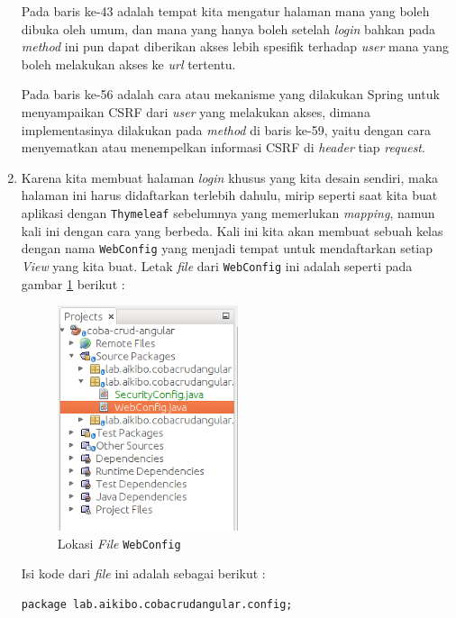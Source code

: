 \begin{enumerate}
	Pada baris ke-43 adalah tempat kita mengatur halaman mana yang boleh dibuka oleh umum, dan mana yang hanya boleh setelah \textit{login} bahkan pada \textit{method} ini pun dapat diberikan akses lebih spesifik terhadap \textit{user} mana yang boleh melakukan akses ke \textit{url} tertentu.
	
	Pada baris ke-56 adalah cara atau mekanisme yang dilakukan Spring untuk menyampaikan CSRF dari \textit{user} yang melakukan akses, dimana implementasinya dilakukan pada \textit{method} di baris ke-59, yaitu dengan cara menyematkan atau menempelkan informasi CSRF di \textit{header} tiap \textit{request}.
	
	\item Karena kita membuat halaman \textit{login} khusus yang kita desain sendiri, maka halaman ini harus didaftarkan terlebih dahulu, mirip seperti saat kita buat aplikasi dengan \texttt{Thymeleaf} sebelumnya yang memerlukan \textit{mapping}, namun kali ini dengan cara yang berbeda. Kali ini kita akan membuat sebuah kelas dengan nama \texttt{WebConfig} yang menjadi tempat untuk mendaftarkan setiap \textit{View} yang kita buat. Letak \textit{file} dari \texttt{WebConfig} ini adalah seperti pada gambar \ref{fig:letak-WebConfig} berikut :
	
	\begin{figure}[H]
		\centering
		\includegraphics[width=0.5\textwidth]{./resources/023-lokasi-webconfig}
		\caption{Lokasi \textit{File} \texttt{WebConfig}}
		\label{fig:letak-WebConfig}
	\end{figure}
	
	Isi kode dari \textit{file} ini adalah sebagai berikut :
	
	\begin{lstlisting}
package lab.aikibo.cobacrudangular.config;


\end{lstlisting}
\end{enumerate}
